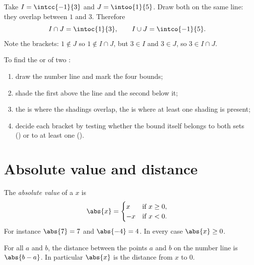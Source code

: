 \begin{example}\label{ex:g10:numbers:interunion}
Take $I = \intcc{-1}{3}$ and $J = \intoo{1}{5}$. Draw both on the same
line: they overlap between $1$ and $3$. Therefore
\[
I \cap J = \intoc{1}{3},
\qquad
I \cup J = \intco{-1}{5}.
\]
Note the brackets: $1 \notin J$ so $1 \notin I \cap J$, but $3 \in I$ and
$3 \in J$, so $3 \in I \cap J$.
\end{example}

\begin{method}\label{met:g10:numbers:intervals}
To find the  or  of two :
\begin{enumerate}
  \item draw the number line and mark the four bounds;
  \item shade the first  above the line and the second below it;
  \item the  is where the shadings overlap, the  is where
        at least one shading is present;
  \item decide each bracket by testing whether the bound itself belongs to
        both sets () or to at least one ().
\end{enumerate}
\end{method}

\section{Absolute value and distance}

\begin{definition}\label{def:g10:numbers:abs}
The \emph{absolute value} of a  $x$ is
\[
\abs{x} =
\begin{cases}
x & \text{if } x \geq 0, \\
-x & \text{if } x < 0.
\end{cases}
\]
For instance $\abs{7} = 7$ and $\abs{-4} = 4$. In every case
$\abs{x} \geq 0$.
\end{definition}

\begin{proposition}\label{prop:g10:numbers:distance}
For all  $a$ and $b$, the distance between the points $a$ and
$b$ on the number line is $\abs{b - a}$. In particular $\abs{x}$ is the
distance from $x$ to $0$.
\end{proposition}

